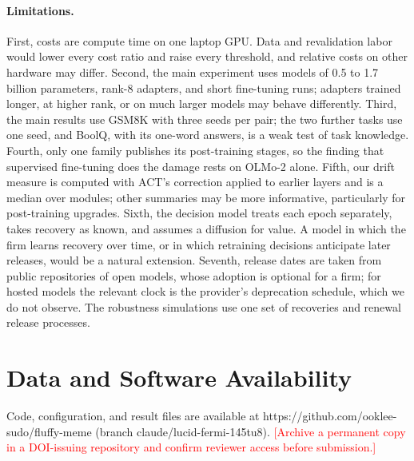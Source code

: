 \documentclass[ijds,nonblindrev]{informs4}
\newcommand{\pending}[1]{\textcolor{red}{[#1]}}
\begin{document}
\paragraph{Limitations.} First, costs are compute time on one laptop GPU. Data and revalidation labor would lower every cost ratio and raise every threshold, and relative costs on other hardware may differ. Second, the main experiment uses models of 0.5 to 1.7 billion parameters, rank-8 adapters, and short fine-tuning runs; adapters trained longer, at higher rank, or on much larger models may behave differently. Third, the main results use GSM8K with three seeds per pair; the two further tasks use one seed, and BoolQ, with its one-word answers, is a weak test of task knowledge. Fourth, only one family publishes its post-training stages, so the finding that supervised fine-tuning does the damage rests on OLMo-2 alone. Fifth, our drift measure is computed with ACT's correction applied to earlier layers and is a median over modules; other summaries may be more informative, particularly for post-training upgrades. Sixth, the decision model treats each epoch separately, takes recovery as known, and assumes a diffusion for value. A model in which the firm learns recovery over time, or in which retraining decisions anticipate later releases, would be a natural extension. Seventh, release dates are taken from public repositories of open models, whose adoption is optional for a firm; for hosted models the relevant clock is the provider's deprecation schedule, which we do not observe. The robustness simulations use one set of recoveries and renewal release processes.

\section*{Data and Software Availability}
Code, configuration, and result files are available at https://github.com/ooklee-sudo/fluffy-meme (branch claude/lucid-fermi-145tu8). \pending{Archive a permanent copy in a DOI-issuing repository and confirm reviewer access before submission.}
\end{document}
